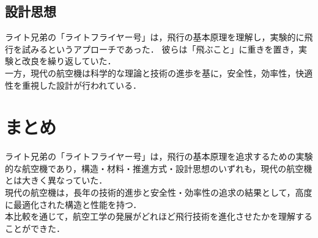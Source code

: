 \documentclass[a4paper,11pt,dvipdfmx]{jsarticle}
\begin{document}
\subsection{設計思想}
ライト兄弟の「ライトフライヤー号」は，飛行の基本原理を理解し，実験的に飛行を試みるというアプローチであった．
彼らは「飛ぶこと」に重きを置き，実験と改良を繰り返していた．\\
一方，現代の航空機は科学的な理論と技術の進歩を基に，安全性，効率性，快適性を重視した設計が行われている．

\section{まとめ}
ライト兄弟の「ライトフライヤー号」は，飛行の基本原理を追求するための実験的な航空機であり，構造・材料・推進方式・設計思想のいずれも，現代の航空機とは大きく異なっていた．\\
現代の航空機は，長年の技術的進歩と安全性・効率性の追求の結果として，高度に最適化された構造と性能を持つ．\\
本比較を通じて，航空工学の発展がどれほど飛行技術を進化させたかを理解することができた．
\end{document}
